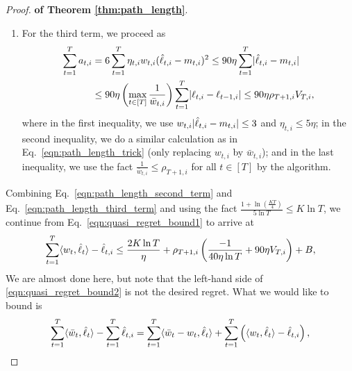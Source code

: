 \begin{proof}{\textbf{of Theorem \ref{thm:path_length}}.}
\begin{enumerate}
\begin{align*}
\frac{u_{i}}{w^\p_{\tau_i+1,i}} \geq \frac{1-\frac{1}{T}}{ \frac{3}{2}w_{\tau_i, i} }\geq \frac{\left(1-\frac{1}{T}\right)^2}{\frac{3}{2}\bar{w}_{\tau_i,i}} =\frac{\left(1-\frac{1}{T}\right)^2}{\frac{3}{2}}\times \frac{\rho_{T+1,i}}{2}\geq \frac{\rho_{T+1,i}}{8} \geq \frac{4K}{8} \geq 1.
\end{align*}
Noting that $h(y)$ is an increasing function when $y\geq 1$, we thus have
\begin{align}
h\left(\frac{u_{i}}{w^\p_{\tau_i+1,i}}\right)\geq h\left(\frac{\rho_{T+1,i}}{8}\right)
=\frac{\rho_{T+1,i}}{8}-1-\ln\left(\frac{\rho_{T+1,i}}{8}\right)\geq \frac{\rho_{T+1,i}}{8}-1-\ln\left(\frac{KT}{4}\right). \label{eqn:path_length_second_term}
\end{align}

\item For the third term, we proceed as
\begin{align}
\sum_{t=1}^T a_{t,i} &= 6\sum_{t=1}^T \eta_{t,i}w_{t,i}(\hat{\ell}_{t,i}-m_{t,i})^2\leq 90\eta \sum_{t=1}^T \lvert {\hat{\ell}_{t,i}-m_{t,i}} \rvert  \nonumber \\
&\leq 90\eta\left(\max_{t\in[T]}\frac{1}{\bar{w}_{t,i}}\right) \sum_{t=1}^{T}  \lvert {\ell_{t,i}-\ell_{t-1,i}} \rvert \leq 90\eta\rho_{T+1,i} V_{T,i}, \label{eqn:path_length_third_term}
\end{align}
where in the first inequality, we use $w_{t,i}\lvert {\hat{\ell}_{t,i}-m_{t,i}} \rvert\leq 3$ and $\eta_{t,i}\leq 5\eta$; in the second inequality, we do a similar calculation as in Eq.~\eqref{eqn:path_length_trick} (only replacing $w_{t,i}$ by $\bar{w}_{t,i}$); and in the last inequality, we use the fact $\frac{1}{\bar{w}_{t,i}}\leq \rho_{T+1,i}$ for all $t\in [T]$
by the algorithm.
\end{enumerate}
Combining Eq.~\eqref{eqn:path_length_second_term} and Eq.~\eqref{eqn:path_length_third_term} and using the fact $\frac{1+\ln\left(\frac{KT}{4}\right)}{5\ln T}\leq K\ln T$, we continue from Eq.~\eqref{eqn:quasi_regret_bound1} to arrive at
\begin{align}
\sum_{t=1}^T \langle {w_t, \hat{\ell}_t} \rangle-\hat{\ell}_{t,i}\leq \frac{2K\ln T}{\eta}+ \rho_{T+1,i}\left( \frac{-1}{40\eta\ln T} +90\eta V_{T,i} \right) +B,  \label{eqn:quasi_regret_bound2}
\end{align}
We are almost done here, but note that the left-hand side of \eqref{eqn:quasi_regret_bound2} is not the desired regret. What we would like to bound is
\begin{align}
\sum_{t=1}^T \inn{\bar{w}_t, \hat{\ell}_t} - \sum_{t=1}^T \hat{\ell}_{t,i}=\sum_{t=1}^T \inn{\bar{w}_t-w_t, \hat{\ell}_t}+ \sum_{t=1}^T\left(\inn{w_t, \hat{\ell}_t}-\hat{\ell}_{t,i}\right), \label{eqn:quasi_regret_bound3}

\end{align}
\end{proof}
